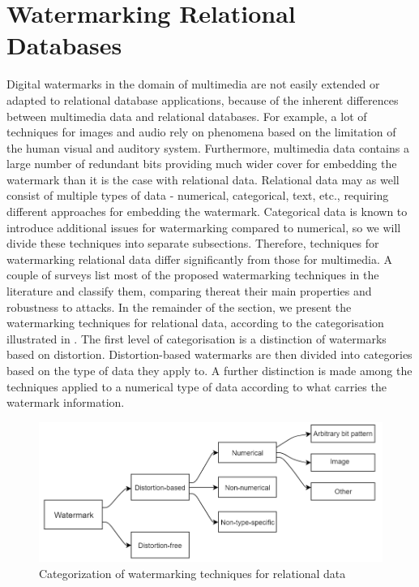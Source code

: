 \section{Watermarking Relational Databases}
Digital watermarks in the domain of multimedia are not easily extended or adapted to relational database applications, because of the inherent differences between multimedia data and relational databases.
For example, a lot of techniques for images and audio rely on phenomena based on the limitation of the human visual and auditory system. Furthermore, multimedia data contains a large number of redundant bits providing much wider cover for embedding the watermark than it is the case with relational data. 
Relational data may as well consist of multiple types of data - numerical, categorical, text, etc., requiring different approaches for embedding the watermark. 
Categorical data is known to introduce additional issues for watermarking compared to numerical, so we will divide these techniques into separate subsections.
Therefore, techniques for watermarking relational data differ significantly from those for multimedia. 
A couple of surveys \cite{rathva2013watermarking,mehta2014watermarking,iftikhar2015survey,kamran2018comprehensive} list most of the proposed watermarking techniques in the literature and classify them, comparing thereat their main properties and robustness to attacks. 
In the remainder of the section, we present the watermarking techniques for relational data, according to the categorisation illustrated in  \cite{halder2010watermarking}. 
The first level of categorisation is a distinction of watermarks based on distortion. Distortion-based watermarks are then divided into categories based on the type of data they apply to. A further distinction is made among the techniques applied to a numerical type of data according to what carries the watermark information. 

\begin{figure}
    \centering
    \includegraphics[width=\textwidth]{Figures/categorization.PNG}
    \caption{Categorization of watermarking techniques for relational data}
    \label{fig:categorization}
\end{figure}

